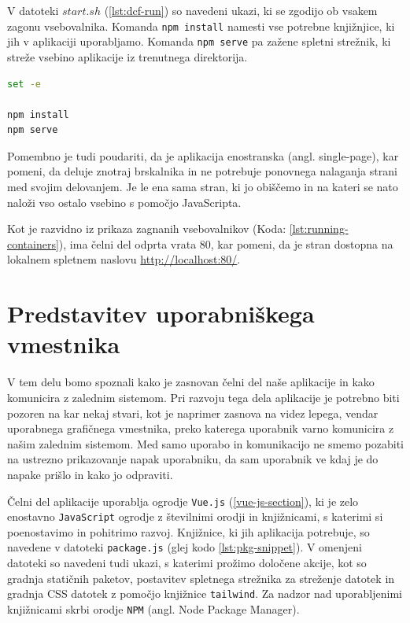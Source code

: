 \documentclass[a4paper, 12pt]{book}
\begin{document}
V datoteki $start.sh$ (\ref{lst:dcf-run}) so navedeni ukazi, ki se zgodijo ob vsakem zagonu vsebovalnika. Komanda \texttt{npm install} namesti vse potrebne knjižnjice, ki jih v aplikaciji uporabljamo. Komanda \texttt{npm serve} pa zažene spletni strežnik, ki streže vsebino aplikacije iz trenutnega direktorija.

\begin{lstlisting}[language=bash,style=mystyle,caption={Ukazna datoteka, ki nasneme potrebne knjižnice in streže aplikacijo},label=lst:dcf-run]
set -e

npm install
npm serve
\end{lstlisting}

Pomembno je tudi poudariti, da je aplikacija enostranska (angl. single-page), kar pomeni, da deluje znotraj brskalnika in ne potrebuje ponovnega nalaganja strani med svojim delovanjem. Je le ena sama stran, ki jo obiščemo in na kateri se nato naloži vso ostalo vsebino s pomočjo JavaScripta.

Kot je razvidno iz prikaza zagnanih vsebovalnikov (Koda: \ref{lst:running-containers}), ima čelni del odprta vrata 80, kar pomeni, da je stran dostopna na lokalnem spletnem naslovu \url{http://localhost:80/}. 



\section{Predstavitev uporabniškega vmestnika}
V tem delu bomo spoznali kako je zasnovan čelni del naše aplikacije in kako komunicira z zalednim sistemom. Pri razvoju tega dela aplikacije je potrebno biti pozoren na kar nekaj stvari, kot je naprimer zasnova na videz lepega, vendar uporabnega grafičnega vmestnika, preko katerega uporabnik varno komunicira z našim zalednim sistemom. Med samo uporabo in komunikacijo ne smemo pozabiti na ustrezno prikazovanje napak uporabniku, da sam uporabnik ve kdaj je do napake prišlo in kako jo odpraviti.

Čelni del aplikacije uporablja ogrodje \verb=Vue.js= (\ref{vue-js-section}), ki je zelo enostavno \verb=JavaScript= ogrodje z številnimi orodji in knjižnicami, s katerimi si poenostavimo in pohitrimo razvoj. Knjižnice, ki jih aplikacija potrebuje, so navedene v datoteki \verb=package.js= (glej kodo \ref{lst:pkg-snippet}). V omenjeni datoteki so navedeni tudi ukazi, s katerimi prožimo določene akcije, kot so gradnja statičnih paketov, postavitev spletnega strežnika za streženje datotek in gradnja CSS datotek z pomočjo knjižnice \verb=tailwind=. Za nadzor nad uporabljenimi knjižnicami skrbi orodje \verb=NPM= (angl. Node Package Manager).
\end{document}
